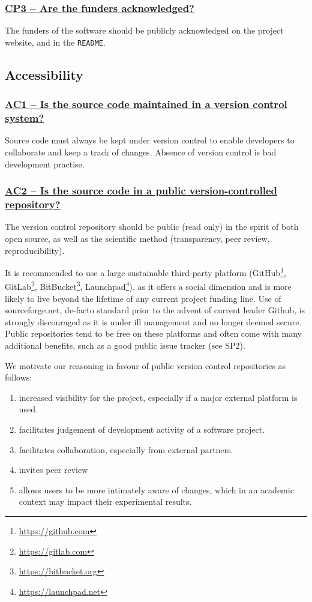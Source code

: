 \documentclass[a4paper,11pt]{article}
\newcommand{\criterion}[1]{\subsubsection*{\underline{#1}}}
\begin{document}
\criterion{CP3 -- Are the funders acknowledged?}

The funders of the software should be publicly acknowledged on the project
website, and in the \texttt{README}.

\subsection{Accessibility}

\criterion{AC1 -- Is the source code maintained in a version control system?}

Source code must always be kept under version control to enable developers to
collaborate and keep a track of changes. Absence of version control is bad
development practise. 

\criterion{AC2 -- Is the source code in a public version-controlled repository?}

The version control repository should be public (read only) in the spirit of both open
source, as well as the scientific method (transparency, peer review,
reproducibility). 

It is recommended to use a large sustainable third-party platform
(GitHub\footnote{\url{https://github.com}},
GitLab\footnote{\url{https://gitlab.com}},
BitBucket\footnote{\url{https://bitbucket.org}},
Launchpad\footnote{\url{https://launchpad.net}}), as it offers a social
dimension and is more likely to live beyond the lifetime of any current project
funding line. Use of sourceforge.net, de-facto standard prior to the advent of
current leader Github, is strongly discouraged as it is under ill management
and no longer deemed secure. Public repositories tend to be free on these platforms and
often come with many additional benefits, such as a good public issue tracker
(see SP2).

We motivate our reasoning in favour of public version control repositories as follows:

\begin{enumerate}
    \item increased visibility for the project, especially if a major external platform is used.
    \item facilitates judgement of development activity of a software project.
    \item facilitates collaboration, especially from external partners.
    \item invites peer review
    \item allows users to be more intimately aware of changes, which in an
        academic context may impact their experimental results.
\end{enumerate}
\end{document}
